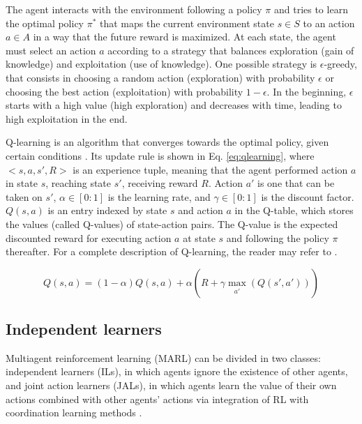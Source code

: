 \documentclass{RITA}
\begin{document}
The agent interacts with the environment following a policy $\pi$ and tries to learn the optimal policy $\pi^*$ that maps the current environment state $s \in S$ to an action $a \in A$ in a way that the future reward is maximized. At each state, the agent must select an action $a$ according to a strategy that balances exploration (gain of knowledge) and exploitation (use of knowledge). One possible strategy is $\epsilon$-greedy, that consists in choosing a random action (exploration) with probability $\epsilon$ or choosing the best action (exploitation) with probability $1 - \epsilon$. In the beginning, $\epsilon$ starts with a high value (high exploration) and decreases with time, leading to high exploitation in the end.

Q-learning is an algorithm that converges towards the optimal policy, given certain conditions \cite{Watkins&Dayan1992}. Its update rule is shown in Eq. \eqref{eq:qlearning}, where $<s,a,s',R>$ is an experience tuple, meaning that the agent performed action $a$ in state $s$, reaching state $s'$, receiving reward $R$. Action $a'$ is one that can be taken on $s'$, $\alpha \in [0:1]$ is the learning rate, and $\gamma \in [0:1]$ is the discount factor. $Q(s,a)$ is an entry indexed by state $s$ and action $a$ in the Q-table, which stores the values (called Q-values) of state-action pairs. The Q-value is the expected discounted reward for executing action $a$ at state $s$ and following the policy $\pi$ thereafter. For a complete description of Q-learning, the reader may refer to \cite{Watkins&Dayan1992}.

\begin{equation}
\label{eq:qlearning}
Q(s,a) = (1 - \alpha) Q(s,a) + \alpha (R + \gamma \max_{\substack{a'}}(Q(s',a')))
\end{equation}


\subsection{Independent learners} 
Multiagent reinforcement learning (MARL) can be divided in two classes: independent learners (ILs), in which agents ignore the existence of other agents, and joint action learners (JALs), in which agents learn the value of their own actions combined with other agents' actions via integration of RL with coordination learning methods \cite{Claus&Boutilier1998}. 
\end{document}
